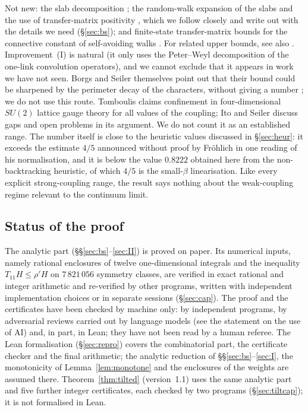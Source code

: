 \documentclass[11pt,a4paper]{article}
\theoremstyle{plain}
\theoremstyle{remark}
\numberwithin{equation}{section}
\begin{document}
Not new: the slab decomposition \cite{DF80}; the random-walk expansion of the slabs and the use of transfer-matrix positivity
\cite{BS83}, which we follow closely and write out with the details we need (\S\ref{sec:bs}); and finite-state transfer-matrix bounds for the connective constant of
self-avoiding walks \cite{PT00}. For related upper bounds, see also
\cite{Alm93}. Improvement~(I) is natural (it only uses the Peter--Weyl decomposition of the one-link
convolution operators), and we cannot exclude that it appears in work we have not seen. Borgs and Seiler themselves point out that
their bound could be sharpened by the perimeter decay of the characters, without giving a number \cite[p.~377]{BS83}; we do not use
this route. Tomboulis \cite{Tom07} claims confinement in four-dimensional $SU(2)$ lattice gauge theory for all values of the
coupling; Ito and Seiler \cite{IS08} discuss gaps and open problems in its argument. We do
not count it as an established range. The number itself is close to the
heuristic values discussed in \S\ref{sec:heur}: it exceeds the estimate $4/5$ announced without proof by Fr\"ohlich
\cite{Fro80a,Fro80b} in one reading of his normalisation, and it is below the value $0.8222$ obtained here from the non-backtracking
heuristic, of which $4/5$ is the small-$\beta$ linearisation. Like every explicit strong-coupling range, the result says nothing about the weak-coupling regime
relevant to the continuum limit.

\subsection{Status of the proof}\label{sec:status}
The analytic part (\S\S\ref{sec:bs}--\ref{sec:II}) is proved on paper. Its numerical inputs, namely rational enclosures of twelve
one-dimensional integrals and the inequality $T_{11}H\le\rho'H$ on $7\,821\,056$ symmetry classes, are verified in exact rational and
integer arithmetic and re-verified by other programs, written with independent implementation choices or in separate sessions
(\S\ref{sec:cap}). The proof and the certificates have been
checked by machine only: by independent programs, by adversarial reviews carried out by language models (see the statement on the
use of AI) and, in part, in Lean; they have not been read by a human referee. The Lean formalisation (\S\ref{sec:repro}) covers the
combinatorial part, the certificate checker and the final arithmetic; the analytic reduction of \S\S\ref{sec:bs}--\ref{sec:I}, the
monotonicity of Lemma~\ref{lem:monotone} and the enclosures of the weights are assumed there. Theorem~\ref{thm:tilted}
(version~1.1) uses the same analytic part and five further integer certificates, each checked by two programs
(\S\ref{sec:tiltcap}); it is not formalised in Lean.
\end{document}
